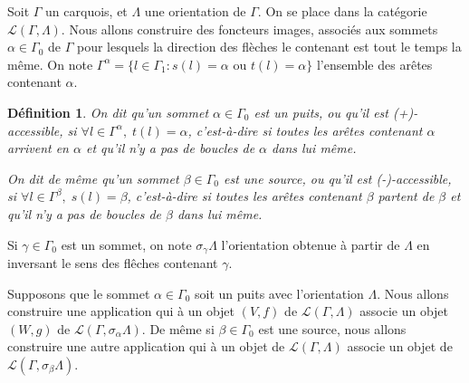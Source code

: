 \documentclass[a4paper,10pt]{article}
\newtheorem{defi}{Définition}[section]
\begin{document}
Soit $\Gamma$ un carquois, et $\Lambda$ une orientation de $\Gamma$. On se place dans la catégorie $\mathscr{L}(\Gamma,\Lambda)$. Nous allons construire des foncteurs images, associés aux sommets $\alpha \in \Gamma_{0}$ de $\Gamma$ pour lesquels la direction des flèches le contenant est tout le temps la même. On note $\Gamma^{\alpha}=\{ l\in \Gamma_{1} : s(l)=\alpha\text{ ou }t(l)=\alpha\}$ l'ensemble des arêtes contenant $\alpha$.

\begin{defi}
	On dit qu'un sommet $\alpha \in \Gamma_{0}$ est un puits, ou qu'il est (+)-accessible, si $\forall l \in \Gamma^{\alpha},\; t(l)=\alpha$, c'est-à-dire si toutes les arêtes contenant $\alpha$ arrivent en $\alpha$ et qu'il n'y a pas de boucles de $\alpha$ dans lui même.

On dit de même qu'un sommet $\beta \in \Gamma_{0}$ est une source, ou qu'il est (-)-accessible, si $\forall l \in \Gamma^{\beta},\; s(l)=\beta$, c'est-à-dire si toutes les arêtes contenant $\beta$ partent de $\beta$ et qu'il n'y a pas de boucles de $\beta$ dans lui même.
\end{defi}


Si $\gamma \in \Gamma_0$ est un sommet, on note $\sigma_{\gamma}\Lambda$ l'orientation obtenue à partir de $\Lambda$ en inversant le sens des flêches contenant $\gamma$.

Supposons que le sommet $\alpha \in \Gamma_{0}$ soit un puits avec l'orientation $\Lambda$.  Nous allons construire une application qui à un objet $(V,f)$ de $\mathscr{L}(\Gamma,\Lambda)$ associe un objet $(W,g)$ de $\mathscr{L}(\Gamma,\sigma_{\alpha}\Lambda)$. De même si $\beta \in \Gamma_0$ est une source, nous allons construire une autre application qui à un objet de $\mathscr L(\Gamma,\Lambda)$ associe un objet de $\mathscr L(\Gamma,\sigma_{\beta}\Lambda)$. 
\end{document}
